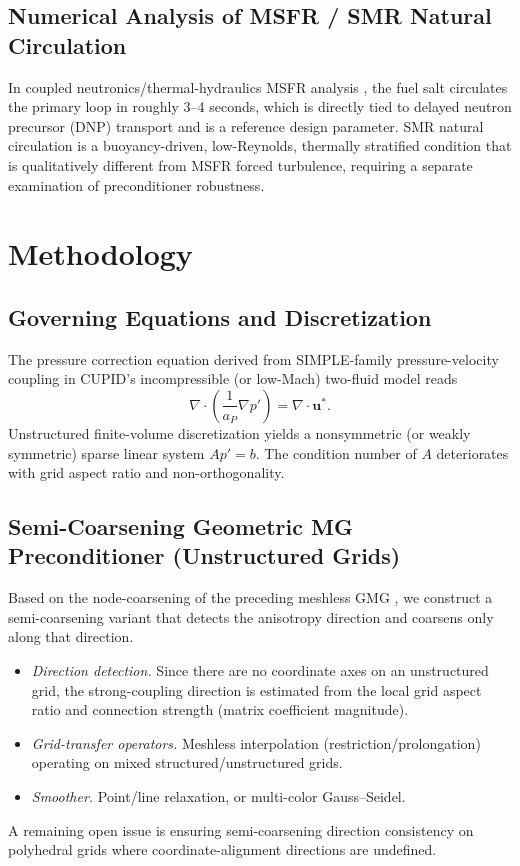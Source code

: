 \documentclass[review]{elsarticle}
\renewcommand{\vec}{\mathbf}
\begin{document}
\subsection{Numerical Analysis of MSFR / SMR Natural Circulation}
In coupled neutronics/thermal-hydraulics MSFR analysis \cite{msfr_coupled}, the fuel salt circulates the primary loop in roughly 3--4 seconds, which is directly tied to delayed neutron precursor (DNP) transport and is a reference design parameter. SMR natural circulation is a buoyancy-driven, low-Reynolds, thermally stratified condition that is qualitatively different from MSFR forced turbulence, requiring a separate examination of preconditioner robustness.

\section{Methodology}
\label{Section:Methodology}

\subsection{Governing Equations and Discretization}
The pressure correction equation derived from SIMPLE-family pressure-velocity coupling in CUPID's incompressible (or low-Mach) two-fluid model reads
\begin{equation}
  \nabla \cdot \left( \frac{1}{a_P} \nabla p' \right) = \nabla \cdot \vec{u}^{*}.
  \label{eq:pressure-correction}
\end{equation}
Unstructured finite-volume discretization yields a nonsymmetric (or weakly symmetric) sparse linear system $A p' = b$. The condition number of $A$ deteriorates with grid aspect ratio and non-orthogonality.

\subsection{Semi-Coarsening Geometric MG Preconditioner (Unstructured Grids)}
Based on the node-coarsening of the preceding meshless GMG \cite{do2024meshless, ha2021nodecoarsening}, we construct a semi-coarsening variant that detects the anisotropy direction and coarsens only along that direction.
\begin{itemize}
  \item \emph{Direction detection.} Since there are no coordinate axes on an unstructured grid, the strong-coupling direction is estimated from the local grid aspect ratio and connection strength (matrix coefficient magnitude).
  \item \emph{Grid-transfer operators.} Meshless interpolation (restriction/prolongation) operating on mixed structured/unstructured grids.
  \item \emph{Smoother.} Point/line relaxation, or multi-color Gauss--Seidel.
\end{itemize}
A remaining open issue is ensuring semi-coarsening direction consistency on polyhedral grids where coordinate-alignment directions are undefined.
\end{document}
